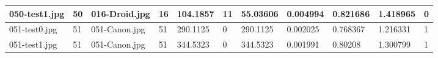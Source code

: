 \begin{landscape}
\begin{longtable}{|p{2cm}|p{1cm}|p{2cm}|p{1cm}|p{2cm}|p{1cm}|p{2cm}|p{2cm}|p{2cm}|p{2cm}|p{1cm}|}
		050-test1.jpg   & 50               & 016-Droid.jpg         & 16                          & 104.1857              & 11                      & 55.03606                   & 0.004994              & 0.821686              & 1.418965                 & 0                \\ \hline
		051-test0.jpg   & 51               & 051-Canon.jpg         & 51                          & 290.1125              & 0                       & 290.1125                   & 0.002025              & 0.768367              & 1.216331                 & 1                \\ \hline
		051-test1.jpg   & 51               & 051-Canon.jpg         & 51                          & 344.5323              & 0                       & 344.5323                   & 0.001991              & 0.80208               & 1.300799                 & 1                \\ \hline
	\end{longtable}
\end{landscape}

